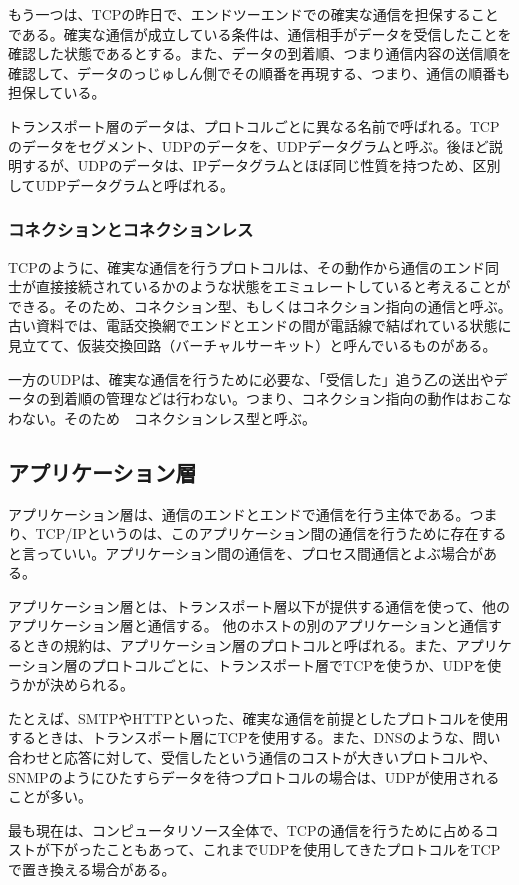 もう一つは、TCPの昨日で、エンドツーエンドでの確実な通信を担保することである。確実な通信が成立している条件は、通信相手がデータを受信したことを確認した状態であるとする。また、データの到着順、つまり通信内容の送信順を確認して、データのっじゅしん側でその順番を再現する、つまり、通信の順番も担保している。

トランスポート層のデータは、プロトコルごとに異なる名前で呼ばれる。TCPのデータをセグメント、UDPのデータを、UDPデータグラムと呼ぶ。後ほど説明するが、UDPのデータは、IPデータグラムとほぼ同じ性質を持つため、区別してUDPデータグラムと呼ばれる。

\subsubsection{コネクションとコネクションレス}
TCPのように、確実な通信を行うプロトコルは、その動作から通信のエンド同士が直接接続されているかのような状態をエミュレートしていると考えることができる。そのため、コネクション型、もしくはコネクション指向の通信と呼ぶ。古い資料では、電話交換網でエンドとエンドの間が電話線で結ばれている状態に見立てて、仮装交換回路（バーチャルサーキット）と呼んでいるものがある。

一方のUDPは、確実な通信を行うために必要な、「受信した」追う乙の送出やデータの到着順の管理などは行わない。つまり、コネクション指向の動作はおこなわない。そのため　コネクションレス型と呼ぶ。


\subsection{アプリケーション層}
アプリケーション層は、通信のエンドとエンドで通信を行う主体である。つまり、TCP/IPというのは、このアプリケーション間の通信を行うために存在すると言っていい。アプリケーション間の通信を、プロセス間通信とよぶ場合がある。

アプリケーション層とは、トランスポート層以下が提供する通信を使って、他のアプリケーション層と通信する。
他のホストの別のアプリケーションと通信するときの規約は、アプリケーション層のプロトコルと呼ばれる。また、アプリケーション層のプロトコルごとに、トランスポート層でTCPを使うか、UDPを使うかが決められる。

たとえば、SMTPやHTTPといった、確実な通信を前提としたプロトコルを使用するときは、トランスポート層にTCPを使用する。また、DNSのような、問い合わせと応答に対して、受信したという通信のコストが大きいプロトコルや、SNMPのようにひたすらデータを待つプロトコルの場合は、UDPが使用されることが多い。

最も現在は、コンピュータリソース全体で、TCPの通信を行うために占めるコストが下がったこともあって、これまでUDPを使用してきたプロトコルをTCPで置き換える場合がある。

